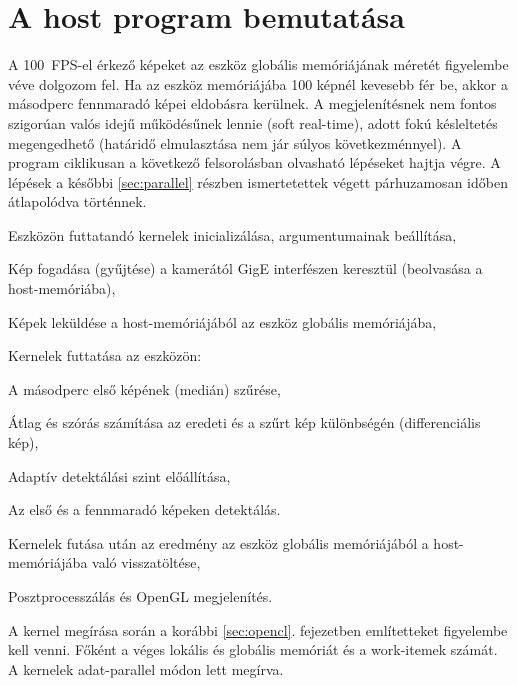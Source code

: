 \chapter{A host program bemutatása}
	A 100~FPS-el érkező képeket az eszköz globális memóriájának méretét figyelembe véve dolgozom fel.
	Ha az eszköz memóriájába 100 képnél kevesebb fér be, akkor a másodperc fennmaradó képei eldobásra kerülnek. 
	A megjelenítésnek nem fontos szigorúan valós idejű működésűnek lennie (soft real-time), adott fokú késleltetés megengedhető 
	(határidő elmulasztása nem jár súlyos következménnyel). A program ciklikusan a következő felsorolásban olvasható lépéseket hajtja
	végre. A lépések a későbbi \ref{sec:parallel} részben ismertetettek végett párhuzamosan időben átlapolódva történnek. 
	\begin{enumerate*}
		\item Eszközön futtatandó kernelek inicializálása, argumentumainak beállítása,
		\item Kép fogadása (gyűjtése) a kamerától GigE interfészen keresztül (beolvasása a host-memóriába),
		\item Képek leküldése a host-memóriájából az eszköz globális memóriájába,
		\item Kernelek futtatása az eszközön:
		\begin{enumerate*}
			\item A másodperc első képének (medián) szűrése,
			\item Átlag és szórás számítása az eredeti és a szűrt kép különbségén (differenciális kép),
			\item Adaptív detektálási szint előállítása,
			\item Az első és a fennmaradó képeken detektálás.
		\end{enumerate*}
		\item Kernelek futása után az eredmény az eszköz globális memóriájából a host-memóriájába való
		visszatöltése,
		\item Posztprocesszálás és OpenGL megjelenítés.
	\end{enumerate*}
	A kernel megírása során a korábbi \ref{sec:opencl}. fejezetben említetteket figyelembe kell venni.
	Főként a véges lokális és globális memóriát és a work-itemek számát. A kernelek adat-parallel módon lett megírva.
	

